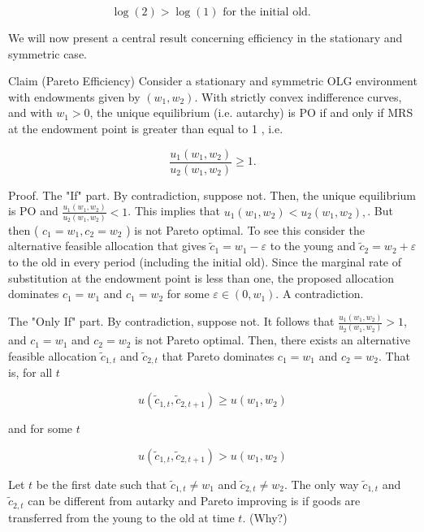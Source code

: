 \documentclass[10pt]{article}
\begin{document}
$$
\log (2)>\log (1) \text { for the initial old. }
$$

We will now present a central result concerning efficiency in the stationary and symmetric case.

Claim (Pareto Efficiency) Consider a stationary and symmetric OLG environment with endowments given by $\left(w_{1}, w_{2}\right)$. With strictly convex indifference curves, and with $w_{1}>0$, the unique equilibrium (i.e. autarchy) is PO if and only if MRS at the endowment point is greater than equal to 1 , i.e.

$$
\frac{u_{1}\left(w_{1}, w_{2}\right)}{u_{2}\left(w_{1}, w_{2}\right)} \geq 1 .
$$

Proof. The "If" part. By contradiction, suppose not. Then, the unique equilibrium is PO and $\frac{u_{1}\left(w_{1}, w_{2}\right)}{u_{2}\left(w_{1}, w_{2}\right)}<1$. This implies that $u_{1}\left(w_{1}, w_{2}\right)<u_{2}\left(w_{1}, w_{2}\right),$. But then ( $c_{1}=w_{1}, c_{2}=w_{2}$ ) is not Pareto optimal. To see this consider the alternative feasible allocation that gives $\widetilde{c}_{1}=w_{1}-\varepsilon$ to the young and $\widetilde{c}_{2}=w_{2}+\varepsilon$ to the old in every period (including the initial old). Since the marginal rate of substitution at the endowment point is less than one, the proposed allocation dominates $c_{1}=w_{1}$ and $c_{1}=w_{2}$ for some $\varepsilon \in\left(0, w_{1}\right)$. A contradiction.

The "Only If" part. By contradiction, suppose not. It follows that $\frac{u_{1}\left(w_{1}, w_{2}\right)}{u_{2}\left(w_{1}, w_{2}\right)}>1$, and $c_{1}=w_{1}$ and $c_{2}=w_{2}$ is not Pareto optimal. Then, there exists an alternative\\
feasible allocation $\widetilde{c}_{1, t}$ and $\widetilde{c}_{2, t}$ that Pareto dominates $c_{1}=w_{1}$ and $c_{2}=w_{2}$. That is, for all $t$

$$
u\left(\widetilde{c}_{1, t}, \widetilde{c}_{2, t+1}\right) \geq u\left(w_{1}, w_{2}\right)
$$

and for some $t$

$$
u\left(\widetilde{c}_{1, t}, \widetilde{c}_{2, t+1}\right)>u\left(w_{1}, w_{2}\right)
$$

Let $t$ be the first date such that $\widetilde{c}_{1, t} \neq w_{1}$ and $\widetilde{c}_{2, t} \neq w_{2}$. The only way $\widetilde{c}_{1, t}$ and $\widetilde{c}_{2, t}$ can be different from autarky and Pareto improving is if goods are transferred from the young to the old at time $t$. (Why?)
\end{document}
